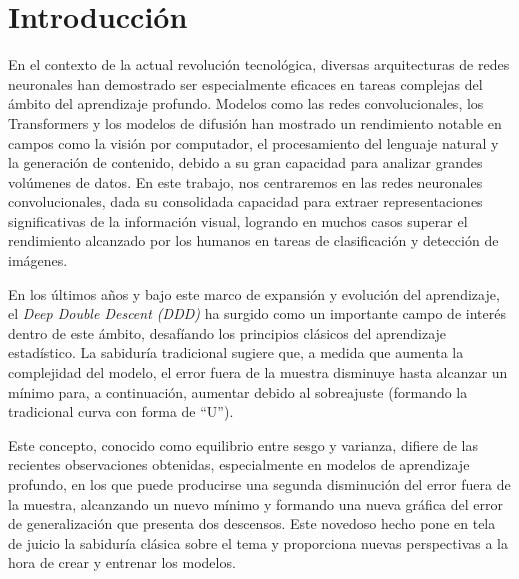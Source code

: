 %


\chapter{Introducción}

En el contexto de la actual revolución tecnológica, diversas arquitecturas de redes neuronales han demostrado ser especialmente eficaces en tareas complejas del ámbito del aprendizaje profundo. Modelos como las redes convolucionales, los Transformers y los modelos de difusión han mostrado un rendimiento notable en campos como la visión por computador, el procesamiento del lenguaje natural y la generación de contenido, debido a su gran capacidad para analizar grandes volúmenes de datos. En este trabajo, nos centraremos en las redes neuronales convolucionales, dada su consolidada capacidad para extraer representaciones significativas de la información visual, logrando en muchos casos superar el rendimiento alcanzado por los humanos en tareas de clasificación y detección de imágenes.

En los últimos años y bajo este marco de expansión y evolución del aprendizaje, el \emph{Deep Double Descent (DDD)} ha surgido como un importante campo de interés dentro de este ámbito, desafíando los principios clásicos del aprendizaje estadístico. La sabiduría tradicional sugiere que, a medida que aumenta la complejidad del modelo, el error fuera de la muestra disminuye hasta alcanzar un mínimo para, a continuación, aumentar debido al sobreajuste (formando la tradicional curva con forma de ``U'').

Este concepto, conocido como equilibrio entre sesgo y varianza, difiere de las recientes observaciones obtenidas, especialmente en modelos de aprendizaje profundo, en los que puede producirse una segunda disminución del error fuera de la muestra, alcanzando un nuevo mínimo y formando una nueva gráfica del error de generalización que presenta dos descensos. Este novedoso hecho pone en tela de juicio la sabiduría clásica sobre el tema y proporciona nuevas perspectivas a la hora de crear y entrenar los modelos.


